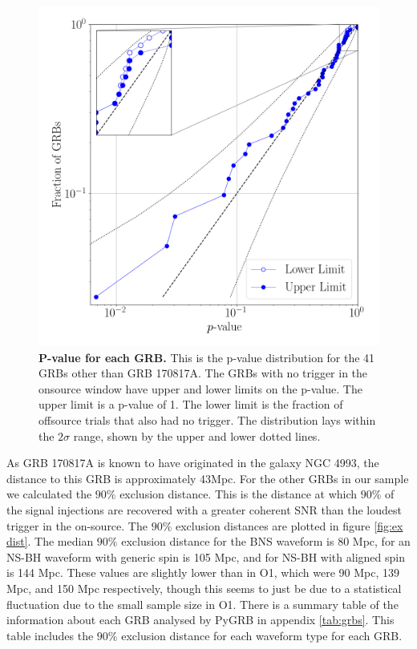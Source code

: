 \documentclass[11pt]{cuthesis}
\begin{document}
\begin{figure}
\begin{center}
\includegraphics[width=0.8\linewidth]{pygrb_pvalue.png}
\end{center}
\caption{\textbf{P-value for each GRB.} This is the p-value distribution for the 41 GRBs other than GRB 170817A. The GRBs with no trigger in the onsource window have upper and lower limits on the p-value. The upper limit is a p-value of 1. The lower limit is the fraction of offsource trials that also had no trigger. The distribution lays within the $2\sigma$ range, shown by the upper and lower dotted lines.  }
\label{fig:pvalue}
\end{figure}

As GRB 170817A is known to have originated in the galaxy NGC 4993\cite{GW170817_GRB}, the distance to this GRB is approximately 43Mpc. For the other GRBs in our sample we calculated the $90\%$ exclusion distance. This is the distance at which $90\%$ of the signal injections are recovered with a greater coherent SNR than the loudest trigger in the on-source. The $90\%$ exclusion distances are plotted in figure \ref{fig:ex dist}. The median $90\%$ exclusion distance for the BNS waveform is 80 Mpc, for an NS-BH waveform with generic spin is 105 Mpc, and for NS-BH with aligned spin is 144 Mpc. These values are slightly lower than in O1, which were 90 Mpc, 139 Mpc, and 150 Mpc respectively\cite{o1grb}, though this seems to just be due to a statistical fluctuation due to the small sample size in O1. There is a summary table of the information about each GRB analysed by PyGRB in appendix \ref{tab:grbs}. This table includes the $90\%$ exclusion distance for each waveform type for each GRB.
\end{document}

